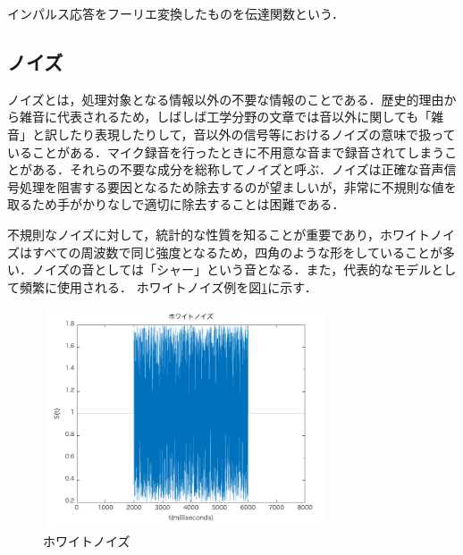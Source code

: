 \documentclass[a4j,11pt]{jsarticle}
\begin{document}
インパルス応答をフーリエ変換したものを伝達関数という．


\newpage

\subsection{ノイズ}
ノイズとは，処理対象となる情報以外の不要な情報のことである．歴史的理由から雑音に代表されるため，しばしば工学分野の文章では音以外に関しても「雑音」と訳したり表現したりして，音以外の信号等におけるノイズの意味で扱っていることがある．マイク録音を行ったときに不用意な音まで録音されてしまうことがある．それらの不要な成分を総称してノイズと呼ぶ．ノイズは正確な音声信号処理を阻害する要因となるため除去するのが望ましいが，非常に不規則な値を取るため手がかりなしで適切に除去することは困難である．

不規則なノイズに対して，統計的な性質を知ることが重要であり，ホワイトノイズはすべての周波数で同じ強度となるため，四角のような形をしていることが多い．ノイズの音としては「シャー」という音となる．また，代表的なモデルとして頻繁に使用される．
ホワイトノイズ例を図\ref{fig:whitenoize}に示す．

\begin{figure}[h]
\begin{center}
 \includegraphics[clip,width=85mm,height=65mm]{whitenoize.pdf}
\end{center}
 \caption{ホワイトノイズ}
 \label{fig:whitenoize}
\end{figure}
\end{document}
